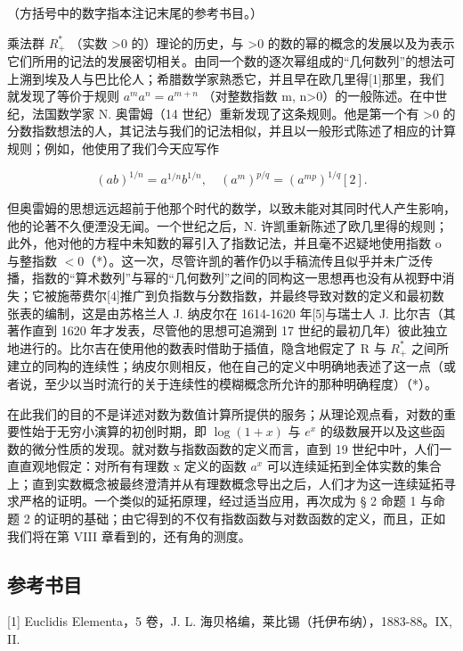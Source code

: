 （方括号中的数字指本注记末尾的参考书目。）

乘法群 \(R_{+}^{*}\) （实数 \textgreater0 的）理论的历史，与 \textgreater0 的数的幂的概念的发展以及为表示它们所用的记法的发展密切相关。由同一个数的逐次幂组成的“几何数列”的想法可上溯到埃及人与巴比伦人；希腊数学家熟悉它，并且早在欧几里得{[}1{]}那里，我们就发现了等价于规则 \(a^{m}a^{n}=a^{m+n}\) （对整数指数 m, n\textgreater0）的一般陈述。在中世纪，法国数学家 N. 奥雷姆（14 世纪）重新发现了这条规则。他是第一个有 \textgreater0 的分数指数想法的人，其记法与我们的记法相似，并且以一般形式陈述了相应的计算规则；例如，他使用了我们今天应写作

\[
(a b) ^ {1 / n} = a ^ {1 / n} b ^ {1 / n}, \quad (a ^ {m}) ^ {p / q} = (a ^ {m p}) ^ {1 / q} [ 2 ].
\]

但奥雷姆的思想远远超前于他那个时代的数学，以致未能对其同时代人产生影响，他的论著不久便湮没无闻。一个世纪之后，N. 许凯重新陈述了欧几里得的规则；此外，他对他的方程中未知数的幂引入了指数记法，并且毫不迟疑地使用指数 o 与整指数 \(< 0\)（*）。这一次，尽管许凯的著作仍以手稿流传且似乎并未广泛传播，指数的“算术数列”与幂的“几何数列”之间的同构这一思想再也没有从视野中消失；它被施蒂费尔{[}4{]}推广到负指数与分数指数，并最终导致对数的定义和最初数张表的编制，这是由苏格兰人 J. 纳皮尔在 1614-1620 年{[}5{]}与瑞士人 J. 比尔吉（其著作直到 1620 年才发表，尽管他的思想可追溯到 17 世纪的最初几年）彼此独立地进行的。比尔吉在使用他的数表时借助于插值，隐含地假定了 R 与 \(R^{*}_{+}\) 之间所建立的同构的连续性；纳皮尔则相反，他在自己的定义中明确地表述了这一点（或者说，至少以当时流行的关于连续性的模糊概念所允许的那种明确程度）（*）。

在此我们的目的不是详述对数为数值计算所提供的服务；从理论观点看，对数的重要性始于无穷小演算的初创时期，即 \(\log(1+x)\) 与 \(e^{x}\) 的级数展开以及这些函数的微分性质的发现。就对数与指数函数的定义而言，直到 19 世纪中叶，人们一直直观地假定：对所有有理数 x 定义的函数 \(a^{x}\) 可以连续延拓到全体实数的集合上；直到实数概念被最终澄清并从有理数概念导出之后，人们才为这一连续延拓寻求严格的证明。一个类似的延拓原理，经过适当应用，再次成为 § 2 命题 1 与命题 2 的证明的基础；由它得到的不仅有指数函数与对数函数的定义，而且，正如我们将在第 VIII 章看到的，还有角的测度。

\subsection*{参考书目}

{[}1{]} Euclidis Elementa，5 卷，J. L. 海贝格编，莱比锡（托伊布纳），1883-88。IX, II.

